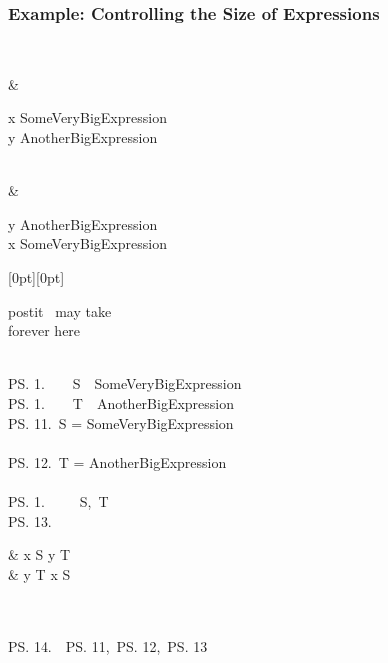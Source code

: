 \begin{frame}
  \frametitle{Example: Controlling the Size of Expressions}

  \qquad\begin{tlablock}
    \LEMMA\
    \begin{noj2}
      & \begin{conj}
          x \in SomeVeryBigExpression\\
          y \in AnotherBigExpression
        \end{conj}\\
      \biimplies &
        \begin{conj}
            y \in AnotherBigExpression\\
            x \in SomeVeryBigExpression
        \end{conj}
\pause
        \hspace{1cm}\raisebox{0cm}[0pt][0pt]{\begin{minipage}{3cm}
          \begin{beamercolorbox}[rounded=true,shadow=true]{postit}\footnotesize
            \OBVIOUS\ may take\\forever here
          \end{beamercolorbox}
        \end{minipage}}
    \end{noj2}\\
\pause
    \ps{1}{.}\ \ \ \DEFINE\ S\ \deq\ SomeVeryBigExpression\\
    \ps{1}{.}\ \ \ \DEFINE\ T\ \deq\ AnotherBigExpression\\
    \ps{1}{1.}\ S = SomeVeryBigExpression\\
    \quad\OBVIOUS\\
    \ps{1}{2.}\ T = AnotherBigExpression\\
    \quad\OBVIOUS\\
    \ps{1}{.}\ \ \ \HIDE\ \DEF\ S,\ T\\
    \ps{1}{3.}\ 
      \begin{noj2}
        & x \in S \land y \in T\\
        \biimplies & y \in T \land x \in S
      \end{noj2}\\
    \quad\OBVIOUS\\
    \ps{1}{4.}\ \QED\qquad\BY\ \ps{1}{1},\ \ps{1}{2},\ \ps{1}{3}
  \end{tlablock}
\end{frame}

